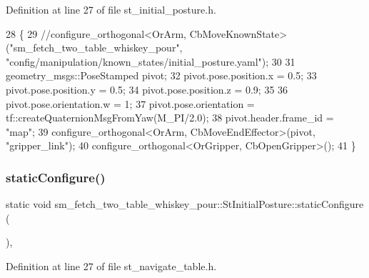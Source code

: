 Definition at line 27 of file st\+\_\+initial\+\_\+posture.\+h.


\begin{DoxyCode}
28         \{
29             \textcolor{comment}{//configure\_orthogonal<OrArm, CbMoveKnownState>("sm\_fetch\_two\_table\_whiskey\_pour",
       "config/manipulation/known\_states/initial\_posture.yaml");}
30 
31             geometry\_msgs::PoseStamped pivot;
32             pivot.pose.position.x = 0.5;
33             pivot.pose.position.y = 0.5;
34             pivot.pose.position.z = 0.9;
35             
36             pivot.pose.orientation.w = 1;
37             pivot.pose.orientation = tf::createQuaternionMsgFromYaw(M\_PI/2.0);
38             pivot.header.frame\_id = \textcolor{stringliteral}{"map"};
39             configure\_orthogonal<OrArm, CbMoveEndEffector>(pivot, \textcolor{stringliteral}{"gripper\_link"});
40             configure\_orthogonal<OrGripper, CbOpenGripper>();
41         \}
\end{DoxyCode}
\mbox{\label{structsm__fetch__two__table__whiskey__pour_1_1StInitialPosture_a6ad91c966d0df4d8cf05c31ef87dc004}} 
\subsubsection{\texorpdfstring{static\+Configure()}{staticConfigure()}\hspace{0.1cm}{\footnotesize\ttfamily [2/2]}}
{\footnotesize\ttfamily static void sm\+\_\+fetch\+\_\+two\+\_\+table\+\_\+whiskey\+\_\+pour\+::\+St\+Initial\+Posture\+::static\+Configure (\begin{DoxyParamCaption}{ }\end{DoxyParamCaption})\hspace{0.3cm}{\ttfamily [inline]}, {\ttfamily [static]}}



Definition at line 27 of file st\+\_\+navigate\+\_\+table.\+h.


